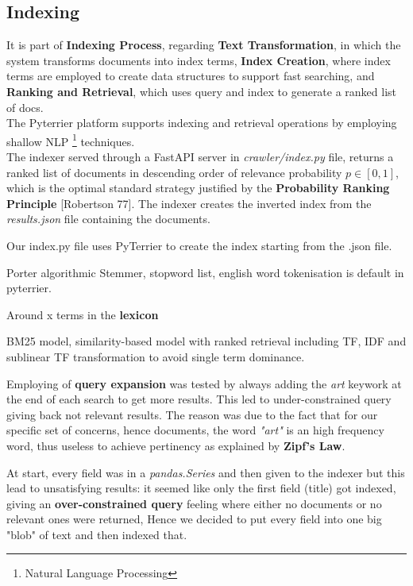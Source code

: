 \documentclass[12pt]{spieman}  %
\begin{document}
\begin{spacing}{1}
    \section{Indexing}\label{sec:indexing}
    It is part of \textbf{Indexing Process},
    regarding \textbf{Text Transformation}, in which the system transforms documents into index terms,
    \textbf{Index Creation}, where index terms are employed to create data structures to support fast searching,
    and \textbf{Ranking and Retrieval}, which uses query and index to generate a ranked list of docs.\\
    The Pyterrier platform supports indexing and retrieval operations by employing shallow
    NLP \footnote{Natural Language Processing}
    techniques.\\
    The indexer served through a FastAPI server in \textit{crawler/index.py} file,
    returns a ranked list of documents in descending order of relevance probability $p \in [0,1]$,
    which is the optimal standard strategy justified by the
    \textbf{Probability Ranking Principle} [Robertson 77].
    The indexer creates the inverted index from the \textit{results.json} file containing the documents.
    \newpage

    Our index.py file uses PyTerrier to create the index starting from the .json file.

    Porter algorithmic Stemmer, stopword list, english word tokenisation is default in pyterrier.

    Around x terms in the \textbf{lexicon}


    BM25 model, similarity-based model with ranked retrieval including TF, IDF and sublinear TF transformation
    to avoid single term dominance.

    Employing of \textbf{query expansion} was tested by always adding the \textit{art} keywork
    at the end of each search to get more results.
    This led to under-constrained query giving back not relevant results.
    The reason was due to the fact that for our specific set of concerns, hence documents, the word
    \textit{"art"} is an high frequency word, thus useless to achieve pertinency as explained by
    \textbf{Zipf's Law}.

    At start, every field was in a \textit{pandas.Series} and then given to the indexer but this lead to
    unsatisfying results: it seemed like only the first field (title) got indexed,
    giving an \textbf{over-constrained query} feeling where either no documents or no relevant ones were returned,
    Hence we decided to put every field into one big "blob" of text and then indexed that.





\end{spacing}
\end{document}
